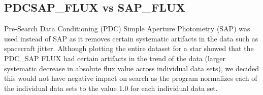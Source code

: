 \documentclass[a4paper]{article}
\begin{document}
\subsection{PDCSAP\_FLUX vs SAP\_FLUX}
Pre-Search Data Conditioning (PDC) Simple Aperture Photometry (SAP) was used instead of SAP as it removes certain systematic artifacts in the data such as spacecraft jitter. Although plotting the entire dataset for a star showed that the PDC\_SAP FLUX had certain artifacts in the trend of the data (larger systematic decrease in absolute flux value across individual data sets), we decided this would not have negative impact on search as the program normalizes each of the individual data sets to the value $1.0$ for each individual data set.
\end{document}
